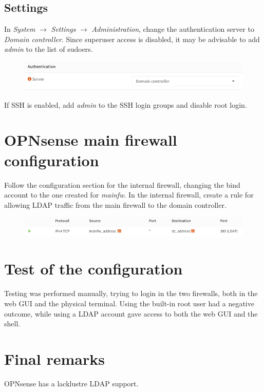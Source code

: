 \documentclass[draft]{homework}
\newcommand{\opn}{OPNsense\xspace}
\begin{document}
    \subsection{Settings}
    In \textit{System} $\rightarrow$ \textit{Settings} $\rightarrow$ \textit{Administration}, change the authentication server to \textit{Domain controller}.
    Since superuser access is disabled, it may be advisable to add \textit{admin} to the list of sudoers.
    \begin{figure}[H]
        \centering
        \includegraphics[width=\linewidth]{images/settings}
        \label{fig:settings}
    \end{figure}
    
    If SSH is enabled, add \textit{admin} to the SSH login groups and disable root login.
    
    
    \section{\opn main firewall configuration}
    Follow the configuration section for the internal firewall, changing the bind account to the one created for \textit{mainfw}.
    In the internal firewall, create a rule for allowing LDAP traffic from the main firewall to the domain controller.
    \begin{figure}[H]
        \centering
        \includegraphics[width=\linewidth]{images/rule}
        \label{fig:rule}
    \end{figure}
    
    
    \section{Test of the configuration}
    Testing was performed manually, trying to login in the two firewalls, both in the web GUI and the physical terminal.
    Using the built-in root user had a negative outcome, while using a LDAP account gave access to both the web GUI and the shell.
    
    
    \section{Final remarks}
    \opn has a lacklustre LDAP support.
    
\end{document}
